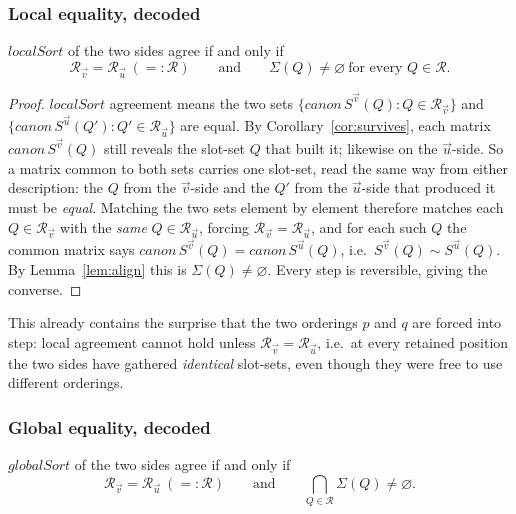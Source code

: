 \subsubsection*{Local equality, decoded}

\begin{lemma}\label{lem:localdecode}
$localSort$ of the two sides agree if and only if
\[
\mathcal R_{\vec v}=\mathcal R_{\vec u}\ (=:\mathcal R)
\qquad\text{and}\qquad
\Sigma(Q)\neq\varnothing\ \text{for every }Q\in\mathcal R.
\]
\end{lemma}

\begin{proof}
$localSort$ agreement means the two sets $\{canon\,S^{\vec v}(Q):Q\in\mathcal
R_{\vec v}\}$ and $\{canon\,S^{\vec u}(Q'):Q'\in\mathcal R_{\vec u}\}$ are equal.
By Corollary~\ref{cor:survives}, each matrix $canon\,S^{\vec v}(Q)$ still reveals
the slot-set $Q$ that built it; likewise on the $\vec u$-side.  So a matrix common
to both sets carries one slot-set, read the same way from either description: the
$Q$ from the $\vec v$-side and the $Q'$ from the $\vec u$-side that produced it must
be \emph{equal}.  Matching the two sets element by element therefore matches each
$Q\in\mathcal R_{\vec v}$ with the \emph{same} $Q\in\mathcal R_{\vec u}$, forcing
$\mathcal R_{\vec v}=\mathcal R_{\vec u}$, and for each such $Q$ the common matrix
says $canon\,S^{\vec v}(Q)=canon\,S^{\vec u}(Q)$, i.e.\ $S^{\vec v}(Q)\sim
S^{\vec u}(Q)$.  By Lemma~\ref{lem:align} this is $\Sigma(Q)\neq\varnothing$.  Every
step is reversible, giving the converse.
\end{proof}

This already contains the surprise that the two orderings $p$ and $q$ are forced
into step: local agreement cannot hold unless $\mathcal R_{\vec v}=\mathcal
R_{\vec u}$, i.e.\ at every retained position the two sides have gathered
\emph{identical} slot-sets, even though they were free to use different orderings.

\subsubsection*{Global equality, decoded}

\begin{lemma}\label{lem:globaldecode}
$globalSort$ of the two sides agree if and only if
\[
\mathcal R_{\vec v}=\mathcal R_{\vec u}\ (=:\mathcal R)
\qquad\text{and}\qquad
\bigcap_{Q\in\mathcal R}\Sigma(Q)\neq\varnothing .
\]
\end{lemma}

